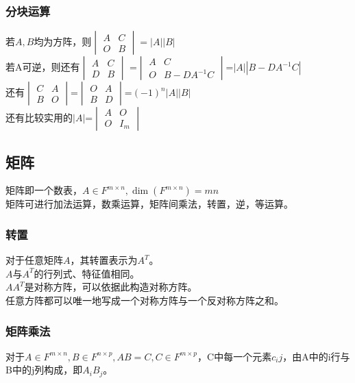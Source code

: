 \documentclass[UTF8]{ctexart}
\begin{document}
	\subsubsection{分块运算}
	若$A,B$均为方阵，则$\begin{vmatrix} A & C \\ \mathit{O} & B \end{vmatrix}=|A||B|$\\
	\indent
	若A可逆，则还有$\begin{vmatrix}A&C \\ D&B\end{vmatrix}$ =$\begin{vmatrix}A&C\\\mathit{O}&B-DA^{-1}C \end{vmatrix}$=$|A||B-DA^{-1}C|$\\
	\indent
	还有$\begin{vmatrix}C&A\\B&\mathit{O}\end{vmatrix}$=$\begin{vmatrix}\mathit{O}&A\\B&D \end{vmatrix}$=$(-1)^{n}|A||B|$\\
	\indent
	还有比较实用的$|A|$=$\begin{vmatrix}A&\mathit{O}\\\mathit{O}&I_{m}\end{vmatrix}$
	\subsection{矩阵}
	矩阵即一个数表，$A\in F^{m\times n},\dim(F^{m\times n})=mn$\\
	\indent
	矩阵可进行加法运算，数乘运算，矩阵间乘法，转置，逆，等运算。
	\subsubsection{转置}
	对于任意矩阵$A$，其转置表示为$A^{T}$。\\
	\indent
	$A$与$A^{T}$的行列式、特征值相同。\\
	\indent
	$AA^{T}$是对称方阵，可以依据此构造对称方阵。\\
	\indent
	任意方阵都可以唯一地写成一个对称方阵与一个反对称方阵之和。
	\subsubsection{矩阵乘法}
	对于$A\in F^{m\times n},B\in F^{n\times p},AB=C,C\in F^{m\times p}$，C中每一个元素$c_ij$，由A中的i行与B中的j列构成，即$A_iB_j$。
\end{document}
